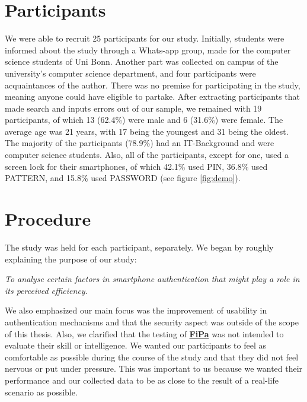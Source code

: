 \section{Participants}

We were able to recruit 25 participants for our study. Initially, students were informed about the study through a Whats-app group, made for the computer science students of Uni Bonn. Another part was collected on campus of the university's computer science department, and four participants were acquaintances of the author. There was no premise for participating in the study, meaning anyone could have eligible to partake. After extracting participants that made search and inputs errors out of our sample, we remained with 19 participants, of which 13 (62.4\%) were male and 6 (31.6\%) were female. The average age was 21 years, with 17 being the youngest and 31 being the oldest. The majority of the participants (78.9\%) had an IT-Background and were computer science students. Also, all of the participants, except for one, used a screen lock for their smartphones, of which 42.1\% used PIN, 36.8\% used PATTERN, and 15.8\% used PASSWORD (see figure \ref{fig:demo}).  


\section{Procedure}
The study was held for each participant, separately. We began by roughly explaining the purpose of our study:

\begin{center}
\textit{To analyse certain factors in smartphone authentication that might play a role in its perceived efficiency.}    
\end{center}

We also emphasized our main focus was the improvement of usability in authentication mechanisms and that the security aspect was outside of the scope of this thesis. Also, we clarified that the testing of \underline{\textbf{FiPa}} was not intended to evaluate their skill or intelligence. We wanted our participants to feel as comfortable as possible during the course of the study and that they did not feel nervous or put under pressure. This was important to us because we wanted their performance and our collected data to be as close to the result of a real-life scenario as possible. \\

